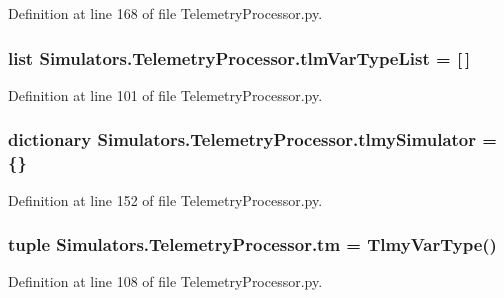 Definition at line 168 of file Telemetry\+Processor.\+py.

\hypertarget{namespace_simulators_1_1_telemetry_processor_a55a89e1c665ed41a1547f8d4532e524e}{}
\subsubsection[{tlm\+Var\+Type\+List}]{\setlength{\rightskip}{0pt plus 5cm}list Simulators.\+Telemetry\+Processor.\+tlm\+Var\+Type\+List = \mbox{[}$\,$\mbox{]}}\label{namespace_simulators_1_1_telemetry_processor_a55a89e1c665ed41a1547f8d4532e524e}


Definition at line 101 of file Telemetry\+Processor.\+py.

\hypertarget{namespace_simulators_1_1_telemetry_processor_a135852f6b75dc272f6d1db863bd290c6}{}
\subsubsection[{tlmy\+Simulator}]{\setlength{\rightskip}{0pt plus 5cm}dictionary Simulators.\+Telemetry\+Processor.\+tlmy\+Simulator = \{\}}\label{namespace_simulators_1_1_telemetry_processor_a135852f6b75dc272f6d1db863bd290c6}


Definition at line 152 of file Telemetry\+Processor.\+py.

\hypertarget{namespace_simulators_1_1_telemetry_processor_a534cc8f0eed75a7ae421b8bde43586f9}{}
\subsubsection[{tm}]{\setlength{\rightskip}{0pt plus 5cm}tuple Simulators.\+Telemetry\+Processor.\+tm = {\bf Tlmy\+Var\+Type}()}\label{namespace_simulators_1_1_telemetry_processor_a534cc8f0eed75a7ae421b8bde43586f9}


Definition at line 108 of file Telemetry\+Processor.\+py.

